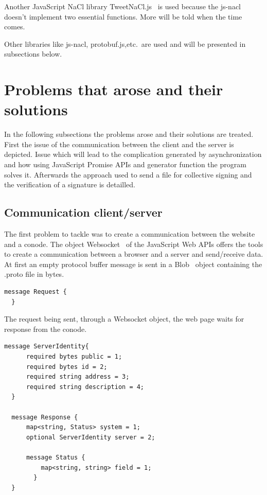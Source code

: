 \documentclass[11pt, a4paper, twoside, openright, openany]{article} %
\begin{document}
Another JavaScript NaCl library TweetNaCl.js~\cite{tweetNacl} is used because
the js-nacl doesn't implement two essential functions.
More will be told when the time comes.
\bigbreak

Other libraries like js-nacl, protobuf.js,etc.\ are used and will be presented
in subsections below.
\bigbreak

\section{Problems that arose and their solutions}
In the following subsections the problems arose and their solutions are treated.
\newline
First the issue of the communication between the client and the server is depicted.
Issue which will lead to the complication generated by asynchronization and how using JavaScript Promise APIs
and generator function the program solves it.
\newline
Afterwards the approach used to send a file for collective signing and the verification of a signature
is detailled.
\bigbreak

\subsection{Communication client/server}
The first problem to tackle was to create a communication between the website
and a conode.
\newline
The object Websocket~\cite{websocketPage} of the JavaScript Web APIs offers the tools to create a communication
between a browser and a server and send/receive data.
\newline
At first an empty protocol buffer message is sent in a Blob~\cite{blob} object containing
the .proto file in bytes.
\bigbreak

\begin{lstlisting}[caption={Empty protocol buffer message}, captionpos=b]
  message Request {
  }
\end{lstlisting}

The request being sent, through a Websocket object, the web page waits for response from the conode.
\bigbreak

\begin{lstlisting}[caption={response protocol buffer message}, captionpos=b]
  message ServerIdentity{
      required bytes public = 1;
      required bytes id = 2;
      required string address = 3;
      required string description = 4;
  }

  message Response {
      map<string, Status> system = 1;
      optional ServerIdentity server = 2;

      message Status {
          map<string, string> field = 1;
    	}
  }
\end{lstlisting}
\end{document}
